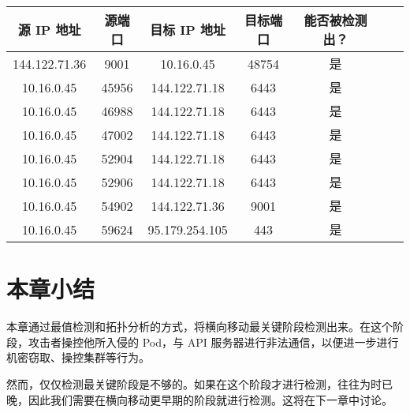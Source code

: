 {\begin{table}[!htbp]
    \label{tab:dataset-topology-detect}
    \centering
    \footnotesize%
    \setlength{\tabcolsep}{4pt}%
    \renewcommand{\arraystretch}{1.2}%
    \begin{tabular}{ccccccc}
        \hline
        源 IP 地址 & 源端口 & 目标 IP 地址 & 目标端口 & 能否被检测出？\\
        \hline
        144.122.71.36 & 9001 & 10.16.0.45 & 48754 & 是\\
        10.16.0.45 & 45956 & 144.122.71.18 & 6443 & 是\\
        10.16.0.45 & 46988 & 144.122.71.18 & 6443 & 是\\
        10.16.0.45 & 47002 & 144.122.71.18 & 6443 & 是\\
        10.16.0.45 & 52904 & 144.122.71.18 & 6443 & 是\\
        10.16.0.45 & 52906 & 144.122.71.18 & 6443 & 是\\
        10.16.0.45 & 54902 & 144.122.71.36 & 9001 & 是\\
        10.16.0.45 & 59624 & 95.179.254.105 & 443 & 是\\
        \hline
    \end{tabular}
\end{table}

\section{本章小结}

本章通过最值检测和拓扑分析的方式，将横向移动最关键阶段检测出来。在这个阶段，攻击者操控他所入侵的 Pod，与 API 服务器进行非法通信，以便进一步进行机密窃取、操控集群等行为。

然而，仅仅检测最关键阶段是不够的。如果在这个阶段才进行检测，往往为时已晚，因此我们需要在横向移动更早期的阶段就进行检测。这将在下一章中讨论。

}